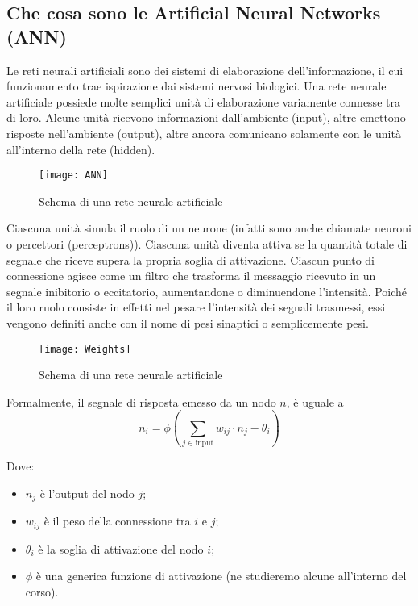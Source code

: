 \subsection{Che cosa sono le Artificial Neural Networks (ANN)}

Le reti neurali artificiali sono dei sistemi di elaborazione dell'informazione,
il cui funzionamento trae ispirazione dai sistemi nervosi biologici. Una rete
neurale artificiale possiede molte semplici unità di elaborazione variamente
connesse tra di loro.
Alcune unità ricevono informazioni dall'ambiente (input),
altre emettono risposte nell'ambiente (output), altre ancora comunicano
solamente con le unità all'interno della rete (hidden).

\begin{figure}[H]
	\centering
	\texttt{[image: ANN]}
	\caption{Schema di una rete neurale artificiale}
\end{figure}

Ciascuna unità simula il ruolo di un neurone (infatti sono anche chiamate
neuroni o percettori (perceptrons)). Ciascuna unità diventa attiva se la
quantità totale di segnale che riceve supera la propria soglia di attivazione.
Ciascun punto di connessione agisce come un filtro che trasforma il messaggio
ricevuto in un segnale inibitorio o eccitatorio, aumentandone o diminuendone
l'intensità. Poiché il loro ruolo consiste in effetti nel pesare l'intensità dei
segnali trasmessi, essi vengono definiti anche con il nome di pesi sinaptici o
semplicemente pesi.

\begin{figure}[H]
	\centering
	\texttt{[image: Weights]}
	\caption{Schema di una rete neurale artificiale}
\end{figure}

Formalmente, il segnale di risposta emesso da un nodo $n$, è uguale a
\begin{equation}
	n_i = \phi(\sum_{j \in \text{input}} w_{ij} \cdot n_j - \theta_i)
\end{equation}

Dove:
\begin{itemize}
	\item $n_j$ è l'output del nodo $j$;
	\item $w_{ij}$ è il peso della connessione tra $i$ e $j$;
	\item $\theta_i$ è la soglia di attivazione del nodo $i$;
	\item $\phi$ è una generica funzione di attivazione (ne studieremo alcune
	      all'interno del corso).
\end{itemize}

